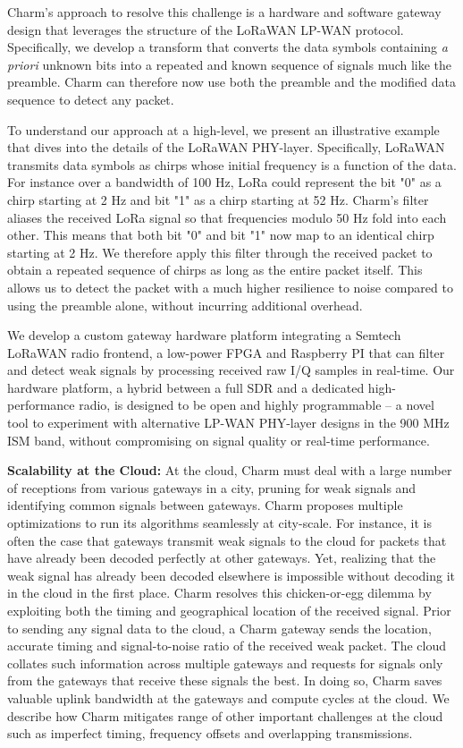 Charm's approach to resolve this challenge is a hardware and software gateway
design that leverages the structure of the LoRaWAN LP-WAN protocol.
Specifically, we develop a transform that converts the data symbols containing
\textit{a priori} unknown bits into a repeated and known sequence of signals
much like the preamble. Charm can therefore now use both the preamble and the
modified data sequence to detect any packet.

To understand our approach at a high-level, we present an illustrative example
that dives into the details of the LoRaWAN PHY-layer. Specifically, LoRaWAN
transmits data symbols as chirps whose initial frequency is a function of the
data. For instance over a bandwidth of 100 Hz, LoRa could represent the bit
"0" as a chirp starting at 2 Hz and bit "1" as a chirp starting at 52 Hz.
Charm's filter aliases the received LoRa signal so that frequencies modulo 50
Hz fold into each other. This means that both bit "0" and bit "1" now map to
an identical chirp starting at 2 Hz. We therefore apply this filter through
the received packet to obtain a repeated sequence of chirps as long as the
entire packet itself. This allows us to detect the packet with a much higher
resilience to noise compared to using the preamble alone, without incurring
additional overhead.

We develop a custom gateway hardware platform integrating a Semtech LoRaWAN
radio frontend, a low-power FPGA and Raspberry PI that can filter and detect
weak signals by processing received raw I/Q samples in real-time. Our hardware
platform, a hybrid between a full SDR and a dedicated high-performance radio,
is designed to be open and highly programmable -- a novel tool to experiment
with alternative LP-WAN PHY-layer designs in the 900 MHz ISM band, without
compromising on signal quality or real-time performance.

\noindent \textbf{Scalability at the Cloud:} At the cloud, Charm must deal
with a large number of receptions from various gateways in a city, pruning for
weak signals and identifying common signals between gateways. Charm proposes
multiple optimizations to run its algorithms seamlessly at city-scale. For
instance, it is often the case that gateways transmit weak signals to the
cloud for packets that have already been decoded perfectly at other gateways.
Yet, realizing that the weak signal has already been decoded elsewhere is
impossible without decoding it in the cloud in the first place. Charm resolves
this chicken-or-egg dilemma by exploiting both the timing and geographical
location of the received signal. Prior to sending any signal data to the
cloud, a Charm gateway sends the location, accurate timing and signal-to-noise
ratio of the received weak packet. The cloud collates such information across
multiple gateways and requests for signals only from the gateways that receive
these signals the best. In doing so, Charm saves valuable uplink bandwidth at
the gateways and compute cycles at the cloud. We describe how Charm mitigates
range of other important challenges at the cloud such as imperfect timing,
frequency offsets and overlapping transmissions.


